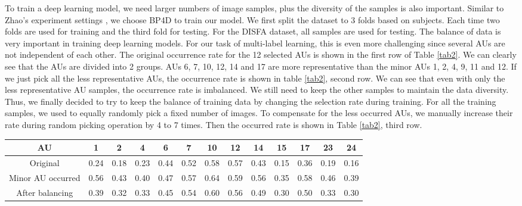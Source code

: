 \documentclass[a4paper, 10pt, conference]{ieeeconf}      %
\begin{document}
To train a deep learning model, we need larger numbers of image samples, plus the diversity of the samples is also important. Similar to Zhao's experiment settings \cite{p22}, we choose BP4D to train our model. We first split the dataset to 3 folds based on subjects. Each time two folds are used for training and the third fold for testing. For the DISFA dataset, all samples are used for testing.
The balance of data is very important in training deep learning models. For our task of multi-label learning, this is even more challenging since several AUs are not independent of each other. The original occurrence rate for the 12 selected AUs is shown in the first row of Table \ref{tab2}. We can clearly see that the AUs are divided into 2 groups. AUs 6, 7, 10, 12, 14 and 17 are more representative than the minor AUs 1, 2, 4, 9, 11 and 12. If we just pick all the less representative AUs, the occurrence rate is shown in table \ref{tab2}, second row. 
We can see that even with only the less representative AU samples, the occurrence rate is imbalanced. We still need to keep the other samples to maintain the data diversity. Thus, we finally decided to try to keep the balance of training data by changing the selection rate during training. For all the training samples, we used to equally randomly pick a fixed number of images. To compensate for the less occurred AUs, we manually increase their rate during random picking operation by 4 to 7 times. Then the occurred rate is shown in Table \ref{tab2}, third row.  

\begin{table*}
\caption{BP4D samples balancing for AU occurrence}
\label{tab2}
\begin{center}
\begin{tabular}{|c|c|c|c|c|c|c|c|c|c|c|c|c|}
\hline
AU & 1 & 2 & 4 & 6 & 7 & 10 & 12 & 14 & 15 & 17 & 23 & 24\\
\hline
Original & 0.24 & 0.18 & 0.23 & 0.44 & 0.52 & 0.58 & 0.57 & 0.43 & 0.15 & 0.36 & 0.19 & 0.16\\
Minor AU occurred & 0.56 & 0.43 & 0.40 & 0.47 & 0.57 & 0.64 & 0.59 & 0.56 & 0.35 & 0.58 & 0.46 & 0.39\\
After balancing & 0.39 & 0.32 & 0.33 & 0.45 & 0.54 & 0.60 & 0.56 & 0.49 & 0.30 & 0.50 & 0.33 & 0.30\\
\hline
\end{tabular}
\end{center}
\end{table*}

\end{document}
